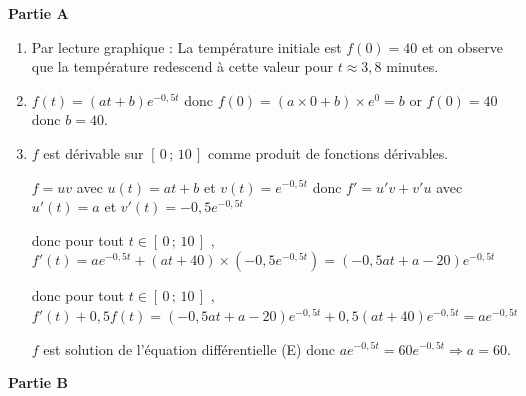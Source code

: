 \medskip

\textbf{Partie A}

\medskip

\begin{enumerate}
\item Par lecture graphique : La température initiale est $f(0) = 40$ et on observe que la température redescend à cette valeur pour $t \approx 3,8$ minutes.

\item  $f(t) = (a t + b) e^{-0{,}5t}$ donc $f(0)= (a \times 0 +b ) \times e^{0}=b$ or $f(0)=40$ donc  $b = 40$.

\item $f$ est dérivable sur $[\,0\,;\,10\,]$ comme produit de fonctions dérivables. 

$f=uv$ avec $u(t)=at+b$ et $v(t)=e^{-0{,}5t}$ donc $f'=u'v+v'u$ avec $u'(t)=a$ et $v'(t)=-0,5e^{-0{,}5t}$ 

donc pour tout $t\in [\,0\,;\,10\,]$ , $ f'(t) =  a e^{-0{,}5t} + (a t + 40)\times \left(-0{,}5e^{-0{,}5t} \right)=\left(-0{,}5 a t + a - 20\right) e^{-0{,}5t}$

donc pour tout $t\in [\,0\,;\,10\,]$ , $f'(t) + 0{,}5 f(t) = \left(-0{,}5 a t + a - 20\right) e^{-0{,}5t} + 0{,}5 (a t + 40)e^{-0{,}5t}= a e^{-0{,}5t}$

$f$ est solution de l'équation différentielle (E) donc $a e^{-0{,}5t} = 60 e^{-0{,}5t} \Rightarrow a = 60$.
\end{enumerate}

\textbf{Partie B}
 


